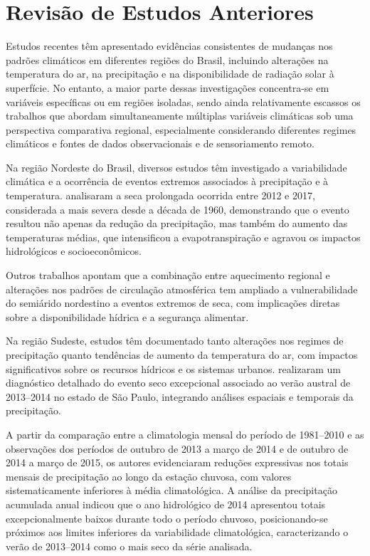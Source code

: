 \section{Revisão de Estudos Anteriores}

Estudos recentes têm apresentado evidências consistentes de mudanças nos padrões climáticos em diferentes regiões do Brasil, incluindo alterações na temperatura do ar, na precipitação e na disponibilidade de radiação solar à superfície. No entanto, a maior parte dessas investigações concentra-se em variáveis específicas ou em regiões isoladas, sendo ainda relativamente escassos os trabalhos que abordam simultaneamente múltiplas variáveis climáticas sob uma perspectiva comparativa regional, especialmente considerando diferentes regimes climáticos e fontes de dados observacionais e de sensoriamento remoto.

Na região Nordeste do Brasil, diversos estudos têm investigado a variabilidade climática e a ocorrência de eventos extremos associados à precipitação e à temperatura. \cite{marengo2017} analisaram a seca prolongada ocorrida entre 2012 e 2017, considerada a mais severa desde a década de 1960, demonstrando que o evento resultou não apenas da redução da precipitação, mas também do aumento das temperaturas médias, que intensificou a evapotranspiração e agravou os impactos hidrológicos e socioeconômicos. 

Outros trabalhos apontam que a combinação entre aquecimento regional e alterações nos padrões de circulação atmosférica tem ampliado a vulnerabilidade do semiárido nordestino a eventos extremos de seca, com implicações diretas sobre a disponibilidade hídrica e a segurança alimentar.

Na região Sudeste, estudos têm documentado tanto alterações nos regimes de precipitação quanto tendências de aumento da temperatura do ar, com impactos significativos sobre os recursos hídricos e os sistemas urbanos. \cite{coelho2016} realizaram um diagnóstico detalhado do evento seco excepcional associado ao verão austral de 2013--2014 no estado de São Paulo, integrando análises espaciais e temporais da precipitação. 

A partir da comparação entre a climatologia mensal do período de 1981--2010 e as observações dos períodos de outubro de 2013 a março de 2014 e de outubro de 2014 a março de 2015, os autores evidenciaram reduções expressivas nos totais mensais de precipitação ao longo da estação chuvosa, com valores sistematicamente inferiores à média climatológica. A análise da precipitação acumulada anual indicou que o ano hidrológico de 2014 apresentou totais excepcionalmente baixos durante todo o período chuvoso, posicionando-se próximos aos limites inferiores da variabilidade climatológica, caracterizando o verão de 2013--2014 como o mais seco da série analisada.


